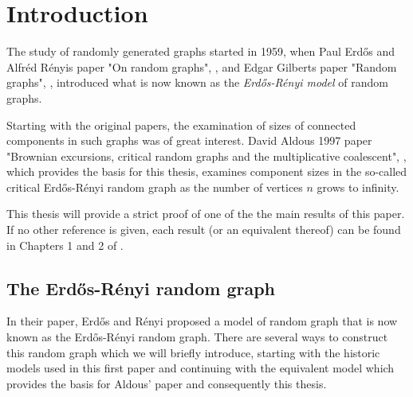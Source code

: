 
\chapter{Introduction}

The study of randomly generated graphs started in 1959,
when Paul Erd\H{o}s and Alfréd Rényis paper "On random graphs", \cite{Erdos.1959},
and Edgar Gilberts paper "Random graphs", \cite{Gilbert.1959},
introduced what is now known as the \emph{Erd\H{o}s-Rényi model} of random graphs.

Starting with the original papers,
the examination of sizes of connected components in such graphs was of great interest.
David Aldous 1997 paper "Brownian excursions, critical random graphs and the multiplicative coalescent", \cite{Aldous.1997},
which provides the basis for this thesis,
examines component sizes in the so-called critical Erd\H{o}s-Rényi random graph as the number of vertices $n$ grows to infinity.

This thesis will provide a strict proof of one of the the main results of this paper.
If no other reference is given, each result (or an equivalent thereof) can be found in Chapters 1 and 2 of \cite{Aldous.1997}.


\section{The Erd\H{o}s-Rényi random graph}

In their paper, Erd\H{o}s and Rényi proposed a model of random graph that is now known as the Erd\H{o}s-Rényi random graph.
There are several ways to construct this random graph which we will briefly introduce,
starting with the historic models used in this first paper 
and continuing with the equivalent model which provides the basis for Aldous' paper and consequently this thesis.


